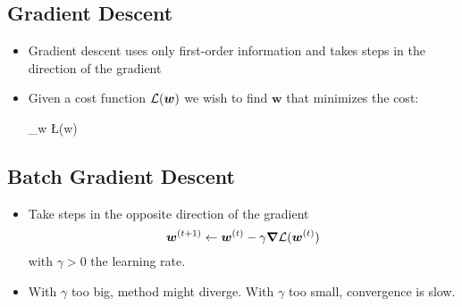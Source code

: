 
\subsection{Gradient Descent}
\begin{itemize}
	\item Gradient descent uses only first-order information and takes steps in the direction of the gradient
	\item Given a cost function $\mathcal{L}(\bm w)$ we wish to find $\bm w$ that minimizes the cost: 
	\begin{myalign*}
	    \min_{\bm w} \L(\bm w)
	\end{myalign*}
\end{itemize}


\subsection{Batch Gradient Descent}
\begin{itemize}
    \item Take steps in the opposite direction of the gradient
    $$ \bm w^{(t + 1)} \leftarrow \bm w^{(t)} - \gamma \bm \nabla \mathcal{L}(\bm w^{(t)})$$
    with $\gamma > 0$ the learning rate. 
    \item With $\gamma$ too big, method might diverge. With $\gamma$ too small, convergence is slow.
\end{itemize}


